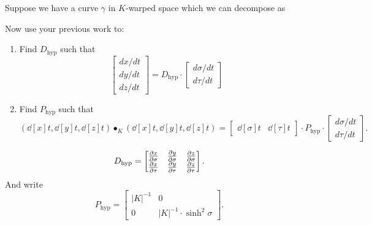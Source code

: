 \documentclass[newpage,hints,,12pt,noauthor,nooutcomes,handout]{ximera}
\begin{document}
\begin{problem}
  Suppose we have a curve $\gamma$ in $K$-warped space which we can decompose as
    \begin{center}
    \end{center}
    Now use your previous work to:
    \begin{enumerate}
    \item Find $D_{\mathrm{hyp}}$ such
      that
      \[
      \begin{bmatrix}
        dx/dt\\ dy/dt \\ dz/dt
      \end{bmatrix}
      = D_{\mathrm{hyp}} \cdot
      \begin{bmatrix}
        d\sigma/dt \\ d\tau/dt
      \end{bmatrix}
      \]
    \item Find $P_\mathrm{hyp}$ such that
      \[
      \left(\dd[x]{t}, \dd[y]{t}, \dd[z]{t}\right)\bullet_K
      \left(\dd[x]{t}, \dd[y]{t}, \dd[z]{t}\right)
      =
      \begin{bmatrix}
        \dd[\sigma]{t} &  \dd[\tau]{t}
      \end{bmatrix}
      \cdot P_\mathrm{hyp}
      \cdot
      \begin{bmatrix}
        d\sigma/dt \\  d\tau/dt
      \end{bmatrix}.
      \]
    \end{enumerate}
    
\begin{freeResponse}
  \[
  D_{\mathrm{hyp}} =
  \begin{bmatrix}
    \pp[x]{\sigma} & \pp[y]{\sigma} & \pp[z]{\sigma} \\
    \pp[x]{\tau}   & \pp[y]{\tau}   & \pp[z]{\tau}
  \end{bmatrix}.
  \]
  And write
     \[
     P_\mathrm{hyp} =
  \begin{bmatrix}
    |K|^{-1} & 0 \\
    0 & |K|^{-1}\cdot\sinh^2 \sigma
  \end{bmatrix}.
  \]
  \end{freeResponse}
\end{problem}
\end{document}
